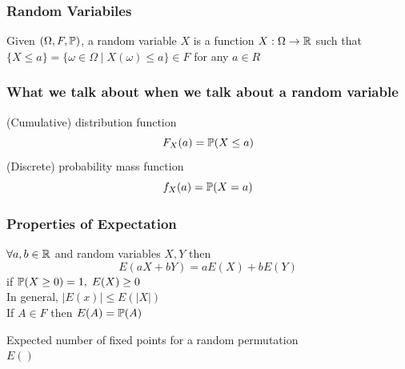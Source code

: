 \subsubsection*{Random Variabiles}
\begin{definition}
    Given $(\Omega, F, \P)$, a random variable $X$ is a function $X: \Omega \rightarrow \R$
    such that $\{X \leq a\}=\{\omega \in \Omega \mid X(\omega) \leq a\} \in F$ for any $a \in R$
\end{definition}

\subsubsection*{What we talk about when we talk about a random variable}
(Cumulative) distribution function
\[
F_X(a)=\P(X \leq a)
\]
(Discrete) probability mass function
\[
f_X(a)=\P(X=a)
\]

\subsubsection*{Properties of Expectation}
$\forall a,b \in \R$ and random variables $X,Y$ then
\[
E(aX+bY)=aE(X)+bE(Y)
\]
if $\P(X \geq 0)=1,\; E(X)\geq 0$\\
In general, $|E(x)|\leq E(|X|)$\\
If $A \in F$ then $E(A)=\P(A)$

\begin{example}
    Expected number of fixed points for a random permutation\\
    $E()$
\end{example}
